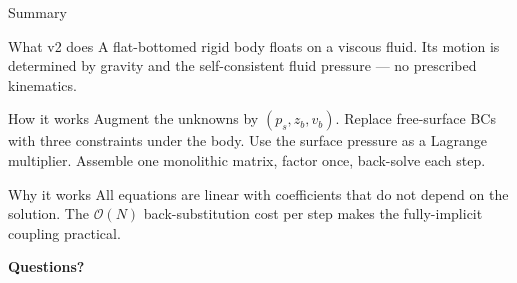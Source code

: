 \documentclass[aspectratio=169, 10pt]{beamer}
\newcommand{\Order}{\mathcal{O}}
\begin{document}
\begin{frame}{Summary}
\begin{block}{What v2 does}
A flat-bottomed rigid body floats on a viscous fluid. Its motion is determined by gravity and the self-consistent fluid pressure — no prescribed kinematics.
\end{block}

\vspace{0.5em}
\begin{block}{How it works}
Augment the unknowns by $(p_s, z_b, v_b)$. Replace free-surface BCs with three constraints under the body. Use the surface pressure as a Lagrange multiplier. Assemble one monolithic matrix, factor once, back-solve each step.
\end{block}

\vspace{0.5em}
\begin{block}{Why it works}
All equations are linear with coefficients that do not depend on the solution. The $\Order(N)$ back-substitution cost per step makes the fully-implicit coupling practical.
\end{block}

\vspace{0.5em}
\begin{center}
\large
\textbf{Questions?}
\end{center}
\end{frame}
\end{document}
